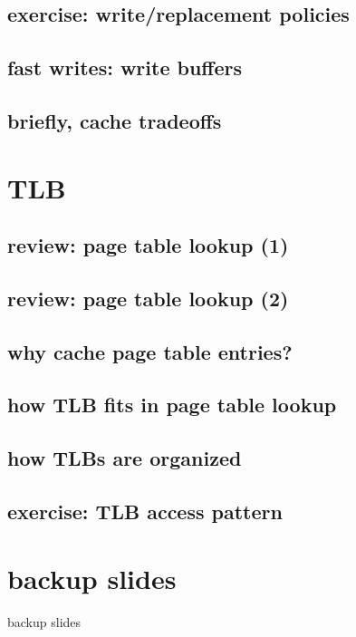 \subsection{exercise: write/replacement policies}


\subsection{fast writes: write buffers}


\subsection{briefly, cache tradeoffs}


\section{TLB}

\subsection{review: page table lookup (1)}


\subsection{review: page table lookup (2)}

\subsection{why cache page table entries?}


\subsection{how TLB fits in page table lookup}


\subsection{how TLBs are organized}

\subsection{exercise: TLB access pattern}




\section{backup slides}
\begin{frame}{backup slides}
\end{frame}


